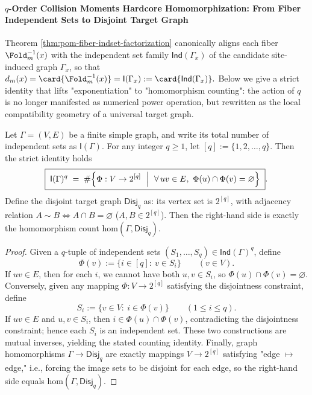 
\paragraph{\texorpdfstring{$q$}{q}-Order Collision Moments Hardcore Homomorphization: From Fiber Independent Sets to Disjoint Target Graph}
Theorem \ref{thm:pom-fiber-indset-factorization} canonically aligns each fiber \(\Fold_m^{-1}(x)\) with the independent set family \(\mathsf{Ind}(\Gamma_x)\) of the candidate site-induced graph \(\Gamma_x\), so that
\(
d_m(x)=\card{\Fold_m^{-1}(x)}=\mathsf{I}(\Gamma_x)
:=\card{\mathsf{Ind}(\Gamma_x)}.
\)
Below we give a strict identity that lifts "exponentiation" to "homomorphism counting": the action of \(q\) is no longer manifested as numerical power operation, but rewritten as the local compatibility geometry of a universal target graph.

\begin{proposition}\label{prop:pom-indset-power-hom-disj}
Let \(\Gamma=(V,E)\) be a finite simple graph, and write its total number of independent sets as \(\mathsf{I}(\Gamma)\).
For any integer \(q\ge 1\), let \([q]:=\{1,2,\dots,q\}\).
Then the strict identity holds
\[
\boxed{\;
\mathsf{I}(\Gamma)^q
\;=\;
\#\Bigl\{\Phi:V\to 2^{[q]}\ \Bigm|\ \forall\,uv\in E,\ \Phi(u)\cap\Phi(v)=\varnothing\Bigr\}\; }.
\]
Define the disjoint target graph \(\mathsf{Disj}_q\) as: its vertex set is \(2^{[q]}\), with adjacency relation
\(
A\sim B \iff A\cap B=\varnothing
\)
(\(A,B\in 2^{[q]}\)).
Then the right-hand side is exactly the homomorphism count \(\mathrm{hom}(\Gamma,\mathsf{Disj}_q)\).
\end{proposition}
\begin{proof}
Given a \(q\)-tuple of independent sets \((S_1,\dots,S_q)\in\mathsf{Ind}(\Gamma)^q\), define
\[
\Phi(v):=\{i\in[q]:\ v\in S_i\}\qquad(v\in V).
\]
If \(uv\in E\), then for each \(i\), we cannot have both \(u,v\in S_i\), so \(\Phi(u)\cap\Phi(v)=\varnothing\).
Conversely, given any mapping \(\Phi:V\to 2^{[q]}\) satisfying the disjointness constraint, define
\[
S_i:=\{v\in V:\ i\in\Phi(v)\}\qquad(1\le i\le q).
\]
If \(uv\in E\) and \(u,v\in S_i\), then \(i\in\Phi(u)\cap\Phi(v)\), contradicting the disjointness constraint; hence each \(S_i\) is an independent set.
These two constructions are mutual inverses, yielding the stated counting identity.
Finally, graph homomorphisms \(\Gamma\to\mathsf{Disj}_q\) are exactly mappings \(V\to 2^{[q]}\) satisfying "edge \(\mapsto\) edge," i.e., forcing the image sets to be disjoint for each edge, so the right-hand side equals \(\mathrm{hom}(\Gamma,\mathsf{Disj}_q)\).
\end{proof}

